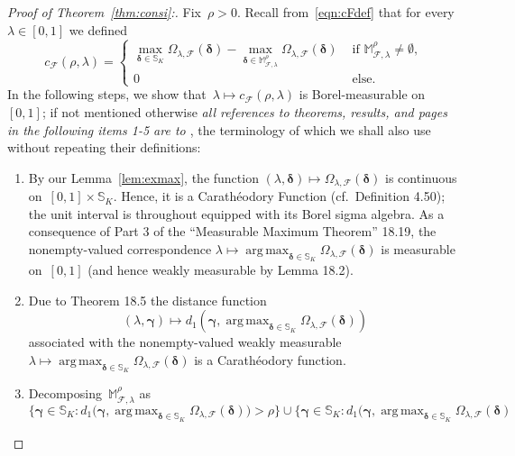 \documentclass[11pt, a4paper]{article}
\DeclareMathOperator*{\argmax}{arg\,max}
\theoremstyle{definition}
\begin{document}
\begin{proof}[Proof of Theorem~\ref{thm:consi}:]
Fix~$\rho > 0$. Recall from~\eqref{eqn:cFdef} that for every~$\lambda \in [0, 1]$ we defined
\begin{equation}
c_{\mathcal{F}}(\rho, \lambda)= 
\begin{cases}
\max_{\bm{\delta} \in \mathbb{S}_K} \Omega_{\lambda, \mathcal{F}}(\bm{\delta}) - \max_{\bm{\delta} \in \mathbb{M}_{\mathcal{F},  \lambda}^{\rho}} \Omega_{\lambda, \mathcal{F}}(\bm{\delta})  & \text{ if } \mathbb{M}_{\mathcal{F},  \lambda}^{\rho} \neq \emptyset, \\
0 & \text{ else.}
\end{cases}
\end{equation}
%
In the following steps, we show that~$\lambda \mapsto 	c_{\mathcal{F}}(\rho, \lambda)$ is Borel-measurable on~$[0, 1]$; if not mentioned otherwise \emph{all references to theorems, results, and pages in the following items 1-5 are to \cite{hhg}}, the terminology of which we shall also use without repeating their definitions:
%
\begin{enumerate}
\item By our Lemma~\ref{lem:exmax}, the function $(\lambda, \bm{\delta}) \mapsto \Omega_{\lambda, \mathcal{F}}(\bm{\delta})$ is continuous on~$[0, 1] \times \mathbb{S}_K$. Hence, it is a Carath\'eodory Function (cf.~Definition 4.50); the unit interval is throughout equipped with its Borel sigma algebra. As a consequence of Part 3 of the ``Measurable Maximum Theorem'' 18.19, the nonempty-valued correspondence $\lambda \mapsto \argmax_{\bm{\delta} \in \mathbb{S}_K} \Omega_{\lambda, \mathcal{F}}(\bm{\delta})$ is measurable on~$[0, 1]$ (and hence weakly measurable by Lemma 18.2).
\item Due to Theorem 18.5 the distance function $$(\lambda, \bm{\gamma}) \mapsto d_1\left(\bm{\gamma},  \argmax_{\bm{\delta} \in \mathbb{S}_K} \Omega_{\lambda, \mathcal{F}}(\bm{\delta})\right)$$ associated with the nonempty-valued weakly measurable $\lambda \mapsto \argmax_{\bm{\delta} \in \mathbb{S}_K} \Omega_{\lambda, \mathcal{F}}(\bm{\delta})$ is a Carath\'eodory function.
\item Decomposing~$\mathbb{M}_{\mathcal{F}, \lambda}^{\rho}$ as 
\begin{equation*}
\big\{\bm{\gamma} \in \mathbb{S}_K : d_1\big( 
\bm{\gamma},
\argmax_{\bm{\delta} \in \mathbb{S}_K} \Omega_{\lambda, \mathcal{F}}(\bm{\delta})
\big) > \rho
\big \} \cup \big\{\bm{\gamma} \in \mathbb{S}_K : d_1\big( 
\bm{\gamma},
\argmax_{\bm{\delta} \in \mathbb{S}_K} \Omega_{\lambda, \mathcal{F}}(\bm{\delta})

\end{equation*}
\end{enumerate}
\end{proof}
\end{document}
